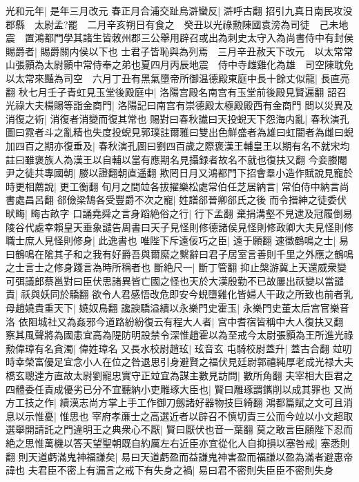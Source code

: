 光和元年|{
	是年三月改元}
春正月合浦交趾烏滸蠻反|{
	滸呼古翻}
招引九真日南民攻没郡縣　太尉孟?罷　二月辛亥朔日有食之　癸丑以光祿勲陳國袁滂為司徒　己未地震　置鴻都門學其諸生皆敇州郡三公舉用辟召或出為刺史太守入為尚書侍中有封侯賜爵者|{
	賜爵關内侯以下也}
士君子皆恥與為列焉　三月辛丑赦天下改元　以太常常山張顥為太尉顥中常侍奉之弟也夏四月丙辰地震　侍中寺雌雞化為雄　司空陳耽免以太常來豔為司空　六月丁丑有黑氣墮帝所御温德殿東庭中長十餘丈似龍|{
	長直亮翻}
秋七月壬子青虹見玉堂後殿庭中|{
	洛陽宫殿名南宫有玉堂前後殿見賢遍翻}
詔召光祿大夫楊賜等詣金商門|{
	洛陽記曰南宫有崇德殿太極殿殿西有金商門}
問以災異及消復之術|{
	消復者消變而復其常也}
賜對曰春秋䜟曰天投蜺天下怨海内亂|{
	春秋演孔圖曰霓者斗之亂精也失度投蜺見郭璞註爾雅曰雙出色鮮盛者為雄曰虹闇者為雌曰蜺}
加四百之期亦復垂及|{
	春秋演孔圖曰劉四百歲之際褒漢王輔皇王以期有名不就宋均註曰雖褒族人為漢王以自輔以當有應期名見攝録者故名不就也復扶又翻}
今妾媵閹尹之徒共專國朝|{
	媵以證翻朝直遥翻}
欺罔日月又鴻都門下招會羣小造作賦說見寵於時更相薦說|{
	更工衡翻}
旬月之間竝各拔擢樂松處常伯任芝居納言|{
	常伯侍中納言尚書處昌呂翻}
郤儉梁鵠各受豐爵不次之寵|{
	姓譜郤晉卿郤氏之後}
而令搢紳之徒委伏畎畮|{
	畮古畝字}
口誦堯舜之言身蹈絶俗之行|{
	行下孟翻}
棄捐溝壑不見逮及冠履倒易陵谷代處幸賴皇天垂象譴告周書曰天子見怪則修德諸侯見怪則修政卿大夫見怪則修職士庶人見怪則修身|{
	此逸書也}
唯陛下斥遠佞巧之臣|{
	遠于願翻}
速徵鶴鳴之士|{
	易曰鶴鳴在隂其子和之我有好爵吾與爾縻之繫辭曰君子居室言善則千里之外應之鶴鳴之士言士之修身踐言為時所稱者也}
斷絶尺一|{
	斷丁管翻}
抑止槃游冀上天還威衆變可弭議郎蔡邕對曰臣伏思諸異皆亡國之怪也天於大漢殷勤不已故屢出祅變以當譴責|{
	祅與妖同於驕翻}
欲令人君感悟改危即安今蜺墮雞化皆婦人干政之所致也前者乳母趙嬈貴重天下|{
	嬈奴鳥翻}
讒諛驕溢續以永樂門史霍玉|{
	永樂門史董太后宫官樂音洛}
依阻城社又為姦邪今道路紛紛復云有程大人者|{
	宫中耆宿皆稱中大人復扶又翻}
察其風聲將為國患宜高為隄防明設禁令深惟趙霍以為至戒今太尉張顥為王所進光祿勲偉璋有名貪濁|{
	偉姓璋名}
又長水校尉趙玹|{
	玹音玄}
屯騎校尉蓋升|{
	蓋古合翻}
竝叨時幸榮富優足宜念小人在位之咎退思引身避賢之福伏見廷尉郭禧純厚老成光禄大夫橋玄聰達方直故太尉劉寵忠實守正竝宜為謀主數見訪問|{
	數所角翻}
夫宰相大臣君之四體委任責成優劣已分不宜聽納小吏雕琢大臣也|{
	賢曰雕琢謂䥴削以成其罪也}
又尚方工技之作|{
	續漢志尚方掌上手工作御刀劔諸好器物技巨綺翻}
鴻都篇賦之文可且消息以示惟憂|{
	惟思也}
宰府孝亷士之高選近者以辟召不慎切責三公而今竝以小文超取選舉開請託之門違明王之典衆心不厭|{
	賢曰厭伏也音一葉翻}
莫之敢言臣願陛下忍而絶之思惟萬機以答天望聖朝既自約厲左右近臣亦宜從化人自抑損以塞咎戒|{
	塞悉則翻}
則天道虧滿鬼神福謙矣|{
	易曰天道虧盈而益謙鬼神害盈而福謙以盈為滿者避惠帝諱也}
夫君臣不密上有漏言之戒下有失身之禍|{
	易曰君不密則失臣臣不密則失身}
